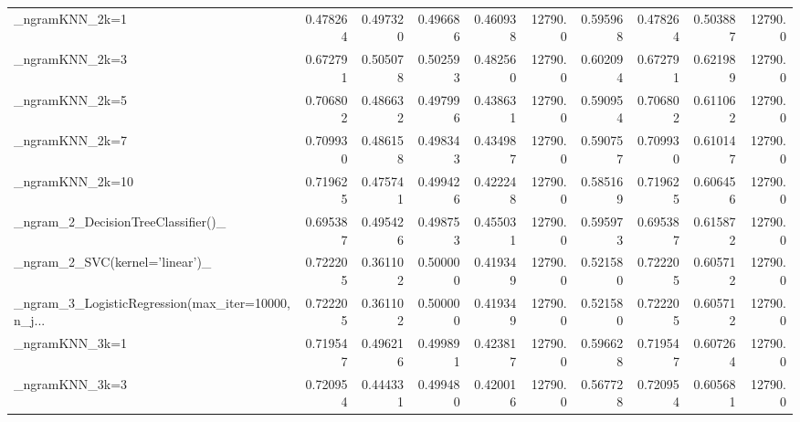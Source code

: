 \begin{tabular}{lrrrrrrrrr}
\_ngramKNN\_2k=1                                     &  0.478264 &         0.497320 &      0.496686 &        0.460938 &        12790.0 &            0.595968 &         0.478264 &           0.503887 &           12790.0 \\
\_ngramKNN\_2k=3                                     &  0.672791 &         0.505078 &      0.502593 &        0.482560 &        12790.0 &            0.602094 &         0.672791 &           0.621989 &           12790.0 \\
\_ngramKNN\_2k=5                                     &  0.706802 &         0.486632 &      0.497996 &        0.438631 &        12790.0 &            0.590954 &         0.706802 &           0.611062 &           12790.0 \\
\_ngramKNN\_2k=7                                     &  0.709930 &         0.486158 &      0.498343 &        0.434987 &        12790.0 &            0.590757 &         0.709930 &           0.610147 &           12790.0 \\
\_ngramKNN\_2k=10                                    &  0.719625 &         0.475741 &      0.499426 &        0.422248 &        12790.0 &            0.585169 &         0.719625 &           0.606456 &           12790.0 \\
\_ngram\_2\_DecisionTreeClassifier()\_                 &  0.695387 &         0.495426 &      0.498753 &        0.455031 &        12790.0 &            0.595973 &         0.695387 &           0.615872 &           12790.0 \\
\_ngram\_2\_SVC(kernel='linear')\_                     &  0.722205 &         0.361102 &      0.500000 &        0.419349 &        12790.0 &            0.521580 &         0.722205 &           0.605712 &           12790.0 \\
\_ngram\_3\_LogisticRegression(max\_iter=10000, n\_j... &  0.722205 &         0.361102 &      0.500000 &        0.419349 &        12790.0 &            0.521580 &         0.722205 &           0.605712 &           12790.0 \\
\_ngramKNN\_3k=1                                     &  0.719547 &         0.496216 &      0.499891 &        0.423817 &        12790.0 &            0.596628 &         0.719547 &           0.607264 &           12790.0 \\
\_ngramKNN\_3k=3                                     &  0.720954 &         0.444331 &      0.499480 &        0.420016 &        12790.0 &            0.567728 &         0.720954 &           0.605681 &           12790.0 \\

\end{tabular}
